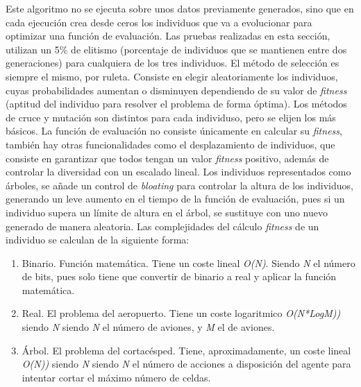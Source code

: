 	Este algoritmo no se ejecuta sobre unos datos previamente generados, sino que en cada ejecución crea desde ceros los individuos que va a evolucionar para optimizar una función de evaluación. Las pruebas realizadas en esta sección, utilizan un 5\% de elitismo (porcentaje de individuos que se mantienen entre dos generaciones) para cualquiera de los tres individuos. El método de selección es siempre el mismo, por ruleta. Consiste en elegir aleatoriamente los individuos, cuyas probabilidades aumentan o disminuyen dependiendo de su valor de \textit{fitness} (aptitud del individuo para resolver el problema de forma óptima). Los métodos de cruce y mutación son distintos para cada individuso, pero se elijen los más básicos. La función de evaluación no consiste únicamente en calcular su \textit{fitness}, también hay otras funcionalidades como el desplazamiento de individuos, que consiste en garantizar que todos tengan un valor \textit{fitness} positivo, además de controlar la diversidad con un escalado lineal. Los individuos representados como árboles, se añade un control de \textit{bloating} para controlar la altura de los individuos, generando un leve aumento en el tiempo de la función de evaluación, pues si un individuo supera un límite de altura en el árbol, se sustituye con uno nuevo generado de manera aleatoria. Las complejidades del cálculo \textit{fitness} de un individuo se calculan de la siguiente forma:
	\begin{enumerate}
		\item Binario. Función matemática. Tiene un coste lineal \textit{O(N)}. Siendo \textit{N} el número de bits, pues solo tiene que convertir de binario a real y aplicar la función matemática.
		\item Real. El problema del aeropuerto. Tiene un coste logaritmico \textit{O(N*LogM))} siendo \textit{N} siendo \textit{N} el número de aviones, y \textit{M} el de aviones.
		\item Árbol. El problema del cortacésped. Tiene, aproximadamente, un coste lineal \textit{O(N))} siendo \textit{N} siendo \textit{N} el número de acciones a disposición del agente para intentar cortar el máximo número de celdas.
	\end{enumerate}
	
	
	

